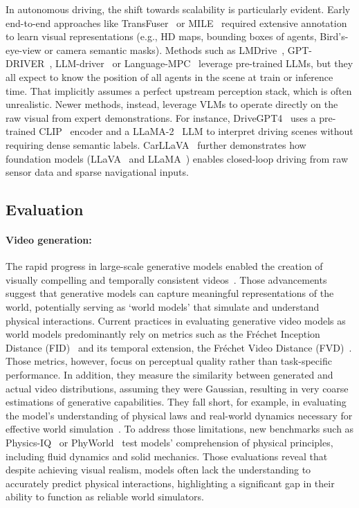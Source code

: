 In autonomous driving, the shift towards scalability is particularly evident.
Early end-to-end approaches like TransFuser~\cite{Chitta2023TransFuser} or MILE~\cite{hu2022mile} required extensive annotation to learn visual representations (e.g., HD maps, bounding boxes of agents, Bird's-eye-view or camera semantic masks).
Methods such as LMDrive~\cite{shao2024lmdrive}, GPT-DRIVER~\cite{mao2023gptdriver}, LLM-driver~\cite{chen2024llmdriver} or Language-MPC~\cite{sha2023languagempc} leverage pre-trained LLMs, but they all expect to know the position of all agents in the scene at train or inference time.
That implicitly assumes a perfect upstream perception stack, which is often unrealistic.
Newer methods, instead, leverage VLMs to operate directly on the raw visual from expert demonstrations. For instance, DriveGPT4~\cite{xu2024drivegpt4} uses a pre-trained CLIP~\cite{radford2021clip} encoder and a LLaMA-2~\cite{touvron2023llama2} LLM to interpret driving scenes without requiring dense semantic labels.
CarLLaVA~\cite{renz2024CarLLaVA} further demonstrates how foundation models (LLaVA~\cite{liu2023llava} and LLaMA~\cite{touvron2023llama}) enables closed-loop driving from raw sensor data and sparse navigational inputs.

\subsection{Evaluation}

\paragraph{Video generation:} The rapid progress in large-scale generative models enabled the creation of visually compelling and temporally consistent videos~\cite{sora,veoteam2024veo2,chefer2025videojam,gao2024vista,hu2023gaia1,hassan2024gem}.
Those advancements suggest that generative models can capture meaningful representations of the world, potentially serving as `world models' that simulate and understand physical interactions.
Current practices in evaluating generative video models as world models predominantly rely on metrics such as the Fréchet Inception Distance (FID)~\cite{heusel2017fid} and its temporal extension, the Fréchet Video Distance (FVD)~\cite{Unterthiner2019FVD}.
Those metrics, however, focus on perceptual quality rather than task-specific performance.
In addition, they measure the similarity between generated and actual video distributions, assuming they were Gaussian, resulting in very coarse estimations of generative capabilities.
They fall short, for example, in evaluating the model's understanding of physical laws and real-world dynamics necessary for effective world simulation~\cite{zhu2024soraworldsim}.
To address those limitations, new benchmarks such as Physics-IQ~\cite{motamed2025physicsIQ} or PhyWorld~\cite{kang2024phyworld} test models' comprehension of physical principles, including fluid dynamics and solid mechanics.
Those evaluations reveal that despite achieving visual realism, models often lack the understanding to accurately predict physical interactions, highlighting a significant gap in their ability to function as reliable world simulators.
%
